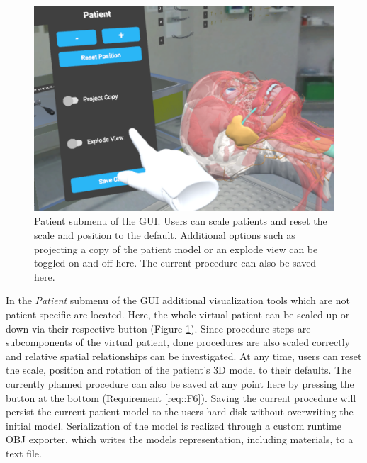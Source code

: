 \begin{figure}[ht]
  \centering
  \includegraphics[width=\linewidth]{images/implementation/user_interface/patient_submenu.png}
  \caption{\label{fig::PatientVisualization}Patient submenu of the GUI. Users can scale patients and reset the scale and position to the default. Additional options such as projecting a 
  copy of the patient model or an explode view can be toggled on and off here. The current procedure can also be saved here.}
\end{figure}

In the \emph{Patient} submenu of the GUI additional visualization tools which are not patient specific are located.
Here, the whole virtual patient can be scaled up or down via their respective button (Figure \ref{fig::PatientVisualization}).
Since procedure steps are subcomponents of the virtual patient, done procedures are also scaled correctly and relative spatial relationships can be investigated.
At any time, users can reset the scale, position and rotation of the patient's 3D model to their defaults.
The currently planned procedure can also be saved at any point here by pressing the button at the bottom (Requirement \ref{req::F6}).
Saving the current procedure will persist the current patient model to the users hard disk without overwriting the initial model.
Serialization of the model is realized through a custom runtime OBJ exporter, which writes the models representation, including materials, to a text file.

